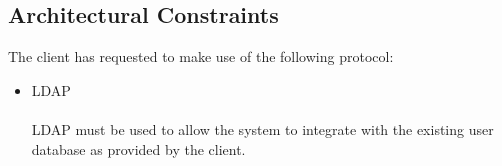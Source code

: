 \subsection{Architectural Constraints}
The client has requested to make use of the following protocol:
\begin{itemize}
	\item LDAP
	\\ \\
	LDAP must be used to allow the system to integrate with the existing user database as provided by the client.
\end{itemize}